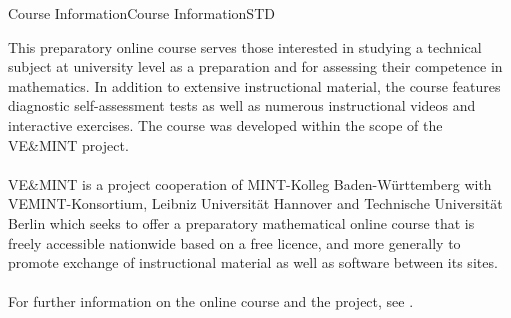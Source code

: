 \begin{MXContent}{Course Information}{Course Information}{STD}

This preparatory online course serves those interested in studying a technical subject at university level as a preparation and for
assessing their competence in mathematics. 
In addition to extensive instructional material, the course features diagnostic self-assessment tests as well as
numerous instructional videos and interactive exercises.
The course was developed within the scope of the VE\&MINT project.
\ \\ \ \\
VE\&MINT is a project cooperation of MINT-Kolleg Baden-Württemberg
with VEMINT-Konsortium, Leibniz Universität Hannover and Technische Universität Berlin which seeks to
offer a preparatory mathematical online course that is freely accessible nationwide based on a free licence,
and more generally to promote exchange of instructional material as well as software between its sites.
\ \\ \ \\
For further information on the online course and the project, see .
\end{MXContent}

